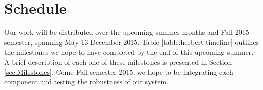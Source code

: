 \documentclass[final, letterpaper, 10 pt, conference, onecolumn]{IEEEtran}
\begin{document}
\section{Schedule}
Our work will be distributed over the upcoming summer months and Fall 2015 semester, spanning May 13-December 2015. Table \ref{table:herbert timeline} outlines the milestones we hope to have completed by the end of this upcoming summer. A brief description of each one of these milestones is presented in Section \ref{sec:Milestones}. Come Fall semester 2015, we hope to be integrating each component and testing the robustness of our system.
\begin{table}[!ht]
\caption{Herbert itemized timeline}
\label{table:herbert timeline}
\end{table}
\end{document}
